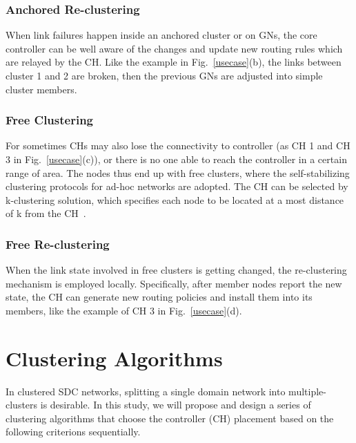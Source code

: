 \documentclass[conference]{IEEEtran}
\begin{document}
\subsubsection{Anchored Re-clustering}
When link failures happen inside an anchored cluster or on GNs, the core controller can be well aware of the changes and update new routing rules which are relayed by the CH. Like the example in Fig.~\ref{usecase}(b), the links between cluster 1 and 2 are broken, then the previous GNs are adjusted into simple cluster members.
\subsubsection{Free Clustering}
For sometimes CHs may also lose the connectivity to controller (as CH 1 and CH 3 in Fig.~\ref{usecase}(c)), or there is no one able to reach the controller in a certain range of area. The nodes thus end up with free clusters, where the self-stabilizing clustering protocols for ad-hoc networks are adopted. The CH can be selected by k-clustering solution, which specifies each node to be located at a most distance of k from the CH~\cite{caron2010self}.
\subsubsection{Free Re-clustering}
When the link state involved in free clusters is getting changed, the re-clustering mechanism is employed locally. Specifically, after member nodes report the new state, the CH can generate new routing policies and install them into its members, like the example of CH 3 in Fig.~\ref{usecase}(d).
\section{Clustering Algorithms}
In clustered SDC networks, splitting a single domain network into multiple-clusters is desirable. In this study, we will propose and design a series of clustering algorithms that choose the controller (CH) placement based on the following criterions sequentially.
\end{document}
